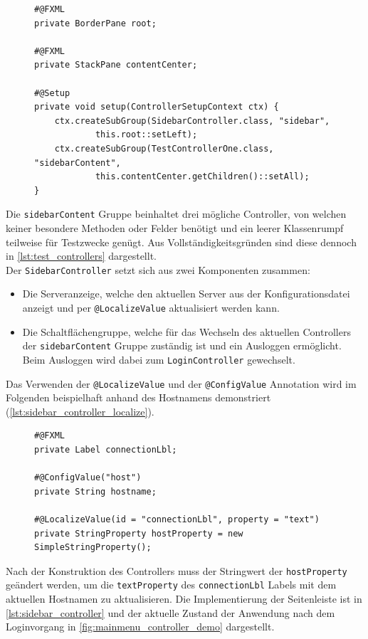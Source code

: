 \begin{figure}[H]
	\begin{lstlisting}[caption=Demo -- Subgruppen Einrichtung, captionpos=b, label=lst:mainmenu_controller_setup]
#@FXML
private BorderPane root;

#@FXML
private StackPane contentCenter;

#@Setup
private void setup(ControllerSetupContext ctx) {
    ctx.createSubGroup(SidebarController.class, "sidebar",
			this.root::setLeft);
    ctx.createSubGroup(TestControllerOne.class, "sidebarContent",
			this.contentCenter.getChildren()::setAll);
}
	\end{lstlisting}
\end{figure}
\noindent Die \texttt{sidebarContent} Gruppe beinhaltet drei mögliche Controller, von welchen keiner besondere Methoden oder Felder benötigt und ein leerer Klassenrumpf teilweise für Testzwecke genügt. Aus Vollständigkeitsgründen sind diese dennoch in \autoref{lst:test_controllers} dargestellt.\\
Der \texttt{SidebarController} setzt sich aus zwei Komponenten zusammen:
\begin{itemize}
	\item Die Serveranzeige, welche den aktuellen Server aus der Konfigurationsdatei anzeigt und per \texttt{@LocalizeValue} aktualisiert werden kann.
	\item Die Schaltflächengruppe, welche für das Wechseln des aktuellen Controllers der \texttt{sidebarContent} Gruppe zuständig ist und ein Ausloggen ermöglicht. Beim Ausloggen wird dabei zum \texttt{LoginController} gewechselt.
\end{itemize}
Das Verwenden der \texttt{@LocalizeValue} und der \texttt{@ConfigValue} Annotation wird im Folgenden beispielhaft anhand des Hostnamens demonstriert (\autoref{lst:sidebar_controller_localize}).
\begin{figure}[H]
	\begin{lstlisting}[caption=Demo -- \texttt{@LocalizeValue} und \texttt{@ConfigValue}, captionpos=b, label=lst:sidebar_controller_localize]
#@FXML
private Label connectionLbl;

#@ConfigValue("host")
private String hostname;

#@LocalizeValue(id = "connectionLbl", property = "text")
private StringProperty hostProperty = new SimpleStringProperty();
	\end{lstlisting}
\end{figure}
\noindent Nach der Konstruktion des Controllers muss der Stringwert der \texttt{hostProperty} geändert werden, um die \texttt{textProperty} des \texttt{connectionLbl} Labels mit dem aktuellen Hostnamen zu aktualisieren. Die Implementierung der Seitenleiste ist in \autoref{lst:sidebar_controller} und der aktuelle Zustand der Anwendung nach dem Loginvorgang in \autoref{fig:mainmenu_controller_demo} dargestellt.

